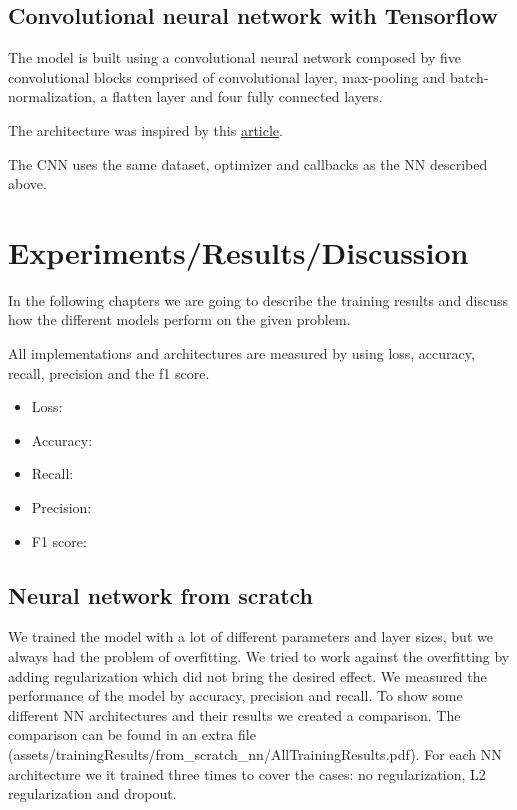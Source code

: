 \documentclass{article}
\begin{document}
\subsection{Convolutional neural network with Tensorflow}
\label{sec:convolutional_neural_network_with_tensorflow}

The model is built using a convolutional neural network composed by five convolutional blocks comprised of convolutional layer, 
max-pooling and batch-normalization, a flatten layer and four fully connected layers.

The architecture was inspired by this \href{https://towardsdatascience.com/deep-learning-for-detecting-pneumonia-from-x-ray-images-fc9a3d9fdba8}{article}.

The CNN uses the same dataset, optimizer and callbacks as the NN described above.

\section{Experiments/Results/Discussion}

In the following chapters we are going to describe the training results and discuss how the 
different models perform on the given problem.

All implementations and architectures are measured by using loss, accuracy, recall, precision and the f1 score. 
\begin{itemize}
  \item Loss: 
  \item Accuracy: 
  \item Recall: 
  \item Precision: 
  \item F1 score: 
\end{itemize}

\subsection{Neural network from scratch}
\label{sec:neural_network_from_scratch}

We trained the model with a lot of different parameters and layer sizes, 
but we always had the problem of overfitting. 
We tried to work against the overfitting by adding regularization which did not bring the desired effect. 
We measured the performance of the model by accuracy, precision and recall. 
To show some different NN architectures and their results we created a comparison. 
The comparison can be found in an extra file (assets/trainingResults/from_scratch_nn/AllTrainingResults.pdf). 
For each NN architecture we it trained three times to cover the cases: no regularization, L2 regularization and dropout.
\end{document}
